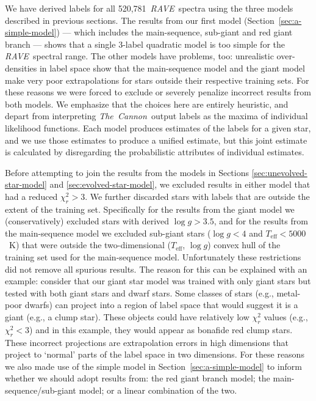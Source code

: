 \documentclass[preprint]{aastex}
\newcommand{\acronym}[1]{{\small{#1}}}
\newcommand{\project}[1]{\textsl{#1}}
\newcommand{\thecannon}{\project{The~Cannon}}
\newcommand{\rave}{\project{\acronym{RAVE}}}
\newcommand{\teff}{T_{\mathrm{eff}}}
\newcommand{\logg}{\log g}
\newcommand{\Nspectra}{520,781}
\begin{document}
We have derived labels for all \Nspectra\ \rave\ spectra using the three models
described in previous sections.  The results from our first model 
(Section~\ref{sec:a-simple-model}) --- which includes the main-sequence, sub-giant 
and red giant branch --- shows that a single 3-label quadratic model is too simple 
for the \rave\ spectral range.   The other models have problems, too: unrealistic 
over-densities in label space show that the main-sequence model and the giant model
make very poor extrapolations for stars outside their respective training sets.  
For these reasons we were forced to exclude or severely penalize incorrect results
from both models.  We emphasize that the choices here are entirely heuristic, 
and depart from interpreting \thecannon\ output labels as the maxima of individual 
likelihood functions.  Each model produces estimates of the labels for a given star, 
and we use those estimates to produce a unified estimate, but this joint estimate 
is calculated by disregarding the probabilistic attributes of individual estimates.


Before attempting to join the results from the models in Sections 
\ref{sec:unevolved-star-model} and \ref{sec:evolved-star-model}, we excluded results
in either model that had a reduced $\chi_{r}^2 > 3$.  We further discarded stars with
labels that are outside the extent of the training set.  Specifically for the
results from the giant model we (conservatively) excluded stars with derived 
$\logg > 3.5$, and for the results from the main-sequence model we excluded 
sub-giant stars ($\logg < 4$ and $\teff < 5000$~K) that were outside the two-dimensional 
($\teff$, $\logg$) convex hull of the training set used for the main-sequence model.  
Unfortunately these restrictions did not remove all spurious results.  The reason 
for this can be explained with an example:  consider that our giant star model was 
trained with only giant stars but tested with both giant stars and dwarf stars.  
Some classes of stars (e.g., metal-poor dwarfs) can project into a region of label 
space that would suggest it is a giant (e.g., a clump star).  These objects could 
have relatively low $\chi_{r}^2$ values (e.g., $\chi_{r}^2 < 3$) and in this example,
they would appear as bonafide red clump stars.  These incorrect projections are 
extrapolation errors in high dimensions that project to `normal' parts of the label 
space in two dimensions.  For these reasons we also made use of the simple model in 
Section~\ref{sec:a-simple-model} to inform whether we should adopt results from: 
the red giant branch model; the main-sequence/sub-giant model; or a linear combination 
of the two. 
\end{document}
